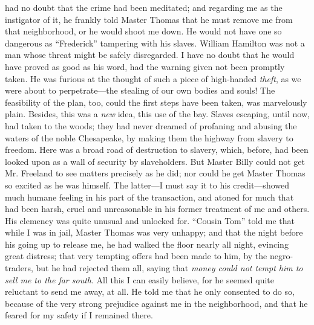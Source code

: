 had no doubt that the crime had been meditated; and regarding me as the
instigator of it, he frankly told Master Thomas that he must remove me
from that neighborhood, or he would shoot me down. He would not have one
so dangerous as ``Frederick'' tampering with his slaves. William
Hamilton was not a man whose threat might be safely disregarded. I have
no doubt that he would have proved as good as his word, had the warning
given not been promptly taken. He was furious at the thought of such a
piece of high-handed \emph{theft}, as we were about to perpetrate---the
stealing of our own bodies and souls! The feasibility of the plan, too,
{}could the first steps have been taken, was marvelously plain. Besides,
this was a \emph{new} idea, this use of the bay. Slaves escaping, until
now, had taken to the woods; they had never dreamed of profaning and
abusing the waters of the noble Chesapeake, by making them the highway
from slavery to freedom. Here was a broad road of destruction to
slavery, which, before, had been looked upon as a wall of security by
slaveholders. But Master Billy could not get Mr. Freeland to see matters
precisely as he did; nor could he get Master Thomas so excited as he was
himself. The latter---I must say it to his credit---showed much humane
feeling in his part of the transaction, and atoned for much that had
been harsh, cruel and unreasonable in his former treatment of me and
others. His clemency was quite unusual and unlocked for. ``Cousin Tom''
told me that while I was in jail, Master Thomas was very unhappy; and
that the night before his going up to release me, he had walked the
floor nearly all night, evincing great distress; that very tempting
offers had been made to him, by the negro-traders, but he had rejected
them all, saying that \emph{money could not tempt him to sell me to the
far south}. All this I can easily believe, for he seemed quite reluctant
to send me away, at all. He told me that he only consented to do so,
because of the very strong prejudice against me in the neighborhood, and
that he feared for my safety if I remained there.

